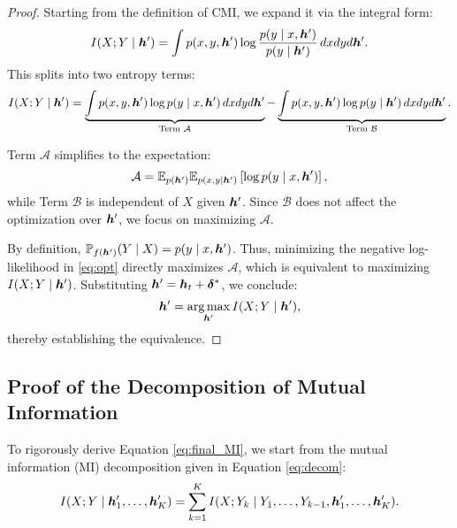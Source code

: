 \begin{proof}
Starting from the definition of CMI, we expand it via the integral form:  
\begin{equation}
I(X; Y \mid {\bm{h}}') = \int p(x, y, {\bm{h}}') \log \frac{p(y \mid x, {\bm{h}}')}{p(y \mid {\bm{h}}')} \, dx dy d{\bm{h}}'.
\end{equation}  
This splits into two entropy terms:  
\begin{align}
I(X; Y \mid {\bm{h}}') = \underbrace{\int p(x, y, {\bm{h}}') \log p(y \mid x, {\bm{h}}') \, dx dy d{\bm{h}}'}_{\text{Term } \mathcal{A}} - \underbrace{\int p(x, y, {\bm{h}}') \log p(y \mid {\bm{h}}') \, dx dy d{\bm{h}}'}_{\text{Term } \mathcal{B}}. \label{eq:split}
\end{align}  

Term $\mathcal{A}$ simplifies to the expectation:  
\begin{equation}
\mathcal{A} = \mathbb{E}_{p({\bm{h}}')} \mathbb{E}_{p(x, y \mid {\bm{h}}')} \left[ \log p(y \mid x, {\bm{h}}') \right],
\end{equation}  
while Term $\mathcal{B}$ is independent of $X$ given ${\bm{h}}'$. Since $\mathcal{B}$ does not affect the optimization over ${\bm{h}}'$, we focus on maximizing $\mathcal{A}$.  

By definition, $\mathbb{P}_{f({\bm{h}}')}(Y \mid X) = p(y \mid x, {\bm{h}}')$. Thus, minimizing the negative log-likelihood in \eqref{eq:opt} directly maximizes $\mathcal{A}$, which is equivalent to maximizing $I(X; Y \mid {\bm{h}}')$. Substituting ${\bm{h}}' = {\bm{h}}_t + \bm{\delta}^*$, we conclude:  
\begin{equation}
{\bm{h}}' = \operatorname*{arg\,max}_{{\bm{h}}'} I(X; Y \mid {\bm{h}}'),
\end{equation}  
thereby establishing the equivalence.  
\end{proof}

\subsection{Proof of the Decomposition of Mutual Information}\label{app:proof_decom}
To rigorously derive Equation \eqref{eq:final_MI}, we start from the mutual information (MI) decomposition given in Equation \eqref{eq:decom}:
\begin{equation}
    I(X; Y \mid {\bm{h}}'_1, \dots, {\bm{h}}'_K) = \sum_{k=1}^{K} I(X; Y_k \mid Y_1, \dots, Y_{k-1}, {\bm{h}}'_1, \dots, {\bm{h}}'_K).
\end{equation}

